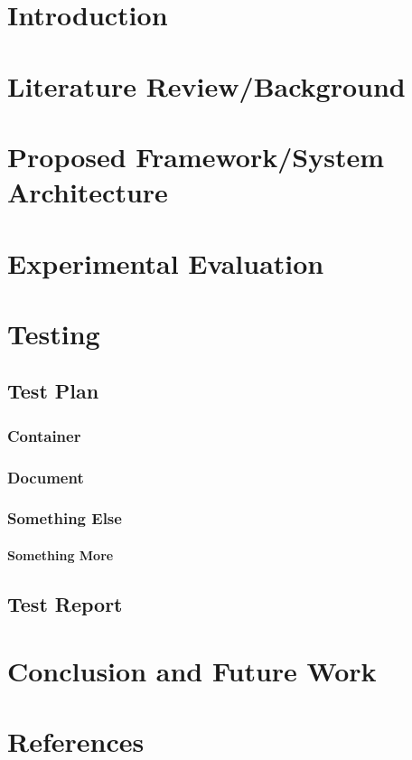 \documentclass{vitmsprojectreport}
\begin{document}
\tableofcontents  %
\listoftables     %
\listoffigures    %

\chapter{Introduction}

\Blindtext[10]

\chapter{Literature Review/Background}

\Blindtext[10]

\chapter{Proposed Framework/System Architecture}

\Blindtext[10]

\chapter{Experimental Evaluation}

\Blindtext[10]

\chapter{Testing}

\section{Test Plan}

\Blindtext[5]

\subsection{Container}

\Blindtext[5]

\subsection{Document}

\Blindtext[5]

\subsection{Something Else}

\Blindtext[3]

\subsubsection{Something More}

\blindtext

\section{Test Report}

\Blindtext[5]

\chapter{Conclusion and Future Work}

\Blindtext[5]

\chapter{References}
\end{document}
